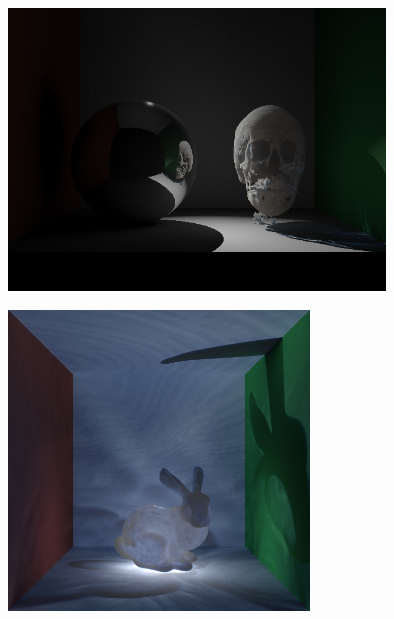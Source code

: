 \documentclass[10pt,compress,professionalfont]{beamer}
\begin{document}
\begin{frame}[c]{}

    {\centering
    \includegraphics[width=100mm]{../img/sphere_skull}\\
    }

\end{frame}




\begin{frame}[c]{}

    {\centering
    \includegraphics[width=80mm]{../img/bunny_glow}\\
    }

\end{frame}
\end{document}
